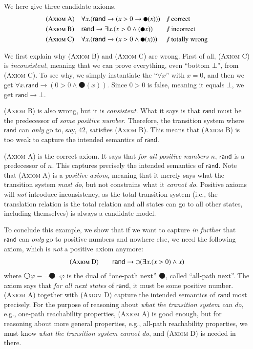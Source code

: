 \documentclass[UTF8,11pt]{article}
\theoremstyle{plain}
\theoremstyle{definition}
\theoremstyle{remark}
\newcommand{\imp}{\to}
\newcommand{\prule}[1]{\textsc{(#1)}}
\newcommand{\wnext}{{\medcirc}}
\newcommand{\snext}{{\medbullet}}
\newcommand{\doubleslash}{/\!/{ }}
\newcommand{\rand}{\mathsf{rand}}
\begin{document}
We here give three candidate axioms.
\begin{align*}
& \prule{Axiom A} &&
\forall x . (\rand \imp (x > 0 \imp \snext(x)))
&& \text{\doubleslash correct} \\
& \prule{Axiom B} &&
\rand \imp \exists x . (x > 0 \wedge (\snext x))
&& \text{\doubleslash incorrect} \\
& \prule{Axiom C} &&
\forall x . (\rand \imp (x > 0 \wedge \snext(x)))
&& \text{\doubleslash totally wrong}
\end{align*}

We first explain why \prule{Axiom B} and \prule{Axiom C} are wrong.
First of all, \prule{Axiom C} is \emph{inconsistent}, meaning that
we can prove everything, even ``bottom $\bot$'', from \prule{Axiom C}.
To see why, we simply instantiate the ``$\forall x$'' with $x = 0$,
and then we get $\forall x . \rand \imp (0 > 0 \wedge \snext(x))$.
Since $0 > 0$ is false, meaning it equals $\bot$,
we get
$\rand \imp \bot$.

\prule{Axiom B} is also wrong, but it is \emph{consistent}.
What it says is that $\rand$ must be the predecessor of \emph{some positive 
number}.
Therefore, the transition system where $\rand$ can \emph{only} go to,
say, $42$, satisfies \prule{Axiom B}.
This means that \prule{Axiom B} is too weak to capture the intended semantics 
of $\rand$.

\prule{Axiom A} is the correct axiom. It says that \emph{for all positive 
numbers 
$n$},
$\rand$ is a predecessor of $n$.
This captures precisely the intended semantics of $\rand$.
Note that \prule{Axiom A} is a \emph{positive axiom}, meaning that
it merely says what the transition system \emph{must do},
but not constrains what it \emph{cannot do}.
Positive axioms will \emph{not} introduce inconsistency, as 
the total transition system (i.e., the translation relation is the total 
relation and all states can go to all other states, including themselves)
is always a candidate model.

To conclude this example, we show that if we want to capture \emph{in further}
that $\rand$ can \emph{only} go to positive numbers and nowhere else,
we need the following axiom, which is \emph{not} a positive axiom anymore:
$$
\prule{Axiom D} \qquad \rand \imp \wnext ( \exists x . (x > 0) \wedge x )
$$
where $\wnext \varphi \equiv \neg \snext \neg \varphi$ is the dual
of ``one-path next'' $\snext$, called ``all-path next''. 
The axiom says that \emph{for all next states} of $\rand$,
it must be some positive number.
\prule{Axiom A} together with \prule{Axiom D} capture the intended semantics
of $\rand$ most precisely. 
For the purpose of reasoning about \emph{what the transition system can do},
e.g., one-path reachability properties,
\prule{Axiom A} is good enough,
but for reasoning about more general properties, e.g., all-path reachability 
properties,
we must know \emph{what the transition system cannot do},
and \prule{Axiom D} is needed in there.
\end{document}
